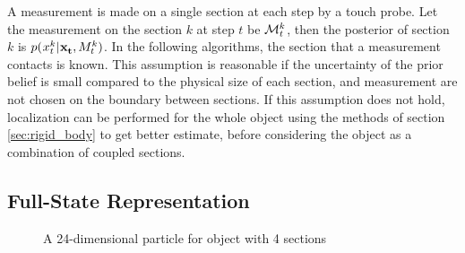 \documentclass[../thesis.tex]{subfiles}
\begin{document}
A measurement is made on a single section at each step by a touch probe.
Let the measurement on the section $k$ at step $t$ be $\mathcal{M}^k_t$, then the posterior of section $k$ is $p(\particle[t][][k]|\mathbf{\particle[t]}, \measurementSet^k_t)$. 
In the following algorithms, the section that a measurement contacts is known.
This assumption is reasonable if the uncertainty of the prior belief is small compared to the physical size of each section, and measurement are not chosen on the boundary between sections.
If this assumption does not hold, localization can be performed for the whole object using the methods of section \ref{sec:rigid_body} to get better estimate, before considering the object as a combination of coupled sections.


\subsection{Full-State Representation} \label{sec:full state}

\begin{figure}
	\centering
	\caption{A 24-dimensional particle for object with 4 sections}
	\label{fig:full-state}
\end{figure}
\end{document}
